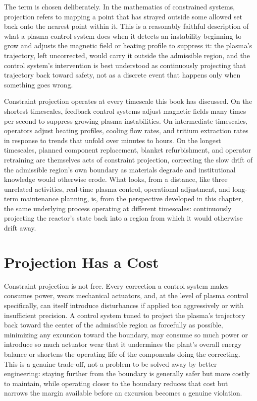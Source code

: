 The term is chosen deliberately. In the mathematics of constrained systems, projection refers to mapping a point that has strayed outside some allowed set back onto the nearest point within it. This is a reasonably faithful description of what a plasma control system does when it detects an instability beginning to grow and adjusts the magnetic field or heating profile to suppress it: the plasma's trajectory, left uncorrected, would carry it outside the admissible region, and the control system's intervention is best understood as continuously projecting that trajectory back toward safety, not as a discrete event that happens only when something goes wrong.

Constraint projection operates at every timescale this book has discussed. On the shortest timescales, feedback control systems adjust magnetic fields many times per second to suppress growing plasma instabilities. On intermediate timescales, operators adjust heating profiles, cooling flow rates, and tritium extraction rates in response to trends that unfold over minutes to hours. On the longest timescales, planned component replacement, blanket refurbishment, and operator retraining are themselves acts of constraint projection, correcting the slow drift of the admissible region's own boundary as materials degrade and institutional knowledge would otherwise erode. What looks, from a distance, like three unrelated activities, real-time plasma control, operational adjustment, and long-term maintenance planning, is, from the perspective developed in this chapter, the same underlying process operating at different timescales: continuously projecting the reactor's state back into a region from which it would otherwise drift away.

\section{Projection Has a Cost}

Constraint projection is not free. Every correction a control system makes consumes power, wears mechanical actuators, and, at the level of plasma control specifically, can itself introduce disturbances if applied too aggressively or with insufficient precision. A control system tuned to project the plasma's trajectory back toward the center of the admissible region as forcefully as possible, minimizing any excursion toward the boundary, may consume so much power or introduce so much actuator wear that it undermines the plant's overall energy balance or shortens the operating life of the components doing the correcting. This is a genuine trade-off, not a problem to be solved away by better engineering: staying further from the boundary is generally safer but more costly to maintain, while operating closer to the boundary reduces that cost but narrows the margin available before an excursion becomes a genuine violation.

